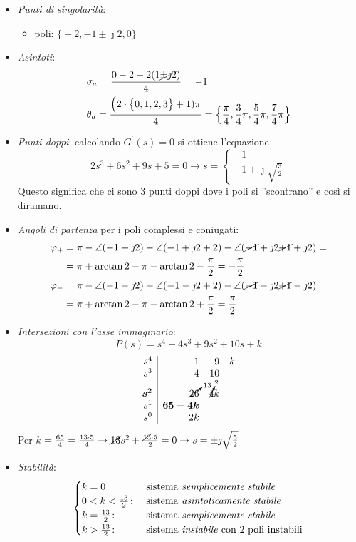 \begin{itemize}
	\item \emph{Punti di singolarità}:
		\begin{itemize}
			\item poli: \(\bigl\{ -2, -1\pm\jmath2, 0 \bigr\}\)
		\end{itemize}
	\item \emph{Asintoti}:
		\begin{align*}
			& \sigma_a = \frac{0-2-2(1\cancel{\pm\jmath2})}{4} = -1 \\
			& \theta_a = \frac{\Bigl(2 \cdot \bigl\{ 0,1,2,3 \bigr\} +1)\pi}{4} = \Bigl\{ \frac{\pi}{4}, \frac{3}{4}\pi, \frac{5}{4}\pi, \frac{7}{4}\pi \Bigr\}
		\end{align*}
	\item \emph{Punti doppi}:
		calcolando \(G^\prime(s) = 0\) si ottiene l'equazione
		\[
			2s^3 +6s^2 +9s +5 = 0 \rightarrow s = \begin{cases} -1 \\ -1 \pm\jmath\sqrt{\frac{3}{2}} \end{cases}
		\]
		Questo significa che ci sono 3 punti doppi dove i poli si
		''scontrano'' e così si diramano.
	\item \emph{Angoli di partenza} per i poli complessi e coniugati:
		\begin{align*}
			\varphi_+ &= \pi - \angle(-1+\jmath2) -\angle(-1+\jmath2+2) -\angle(\cancel{-1}+\jmath2\cancel{+1}+\jmath2) = \\
				  &= \pi +\arctan{2} -\pi -\arctan{2} -\frac{\pi}{2} = -\frac{\pi}{2} \\
			\varphi_- &= \pi -\angle(-1-\jmath2) -\angle(-1-\jmath2+2) -\angle(\cancel{-1}-\jmath2\cancel{+1}-\jmath2) = \\
				  &= \pi +\arctan{2} -\pi -\arctan{2} +\frac{\pi}{2} = \frac{\pi}{2}
		\end{align*}
	\item \emph{Intersezioni con l'asse immaginario}:
		\[
			P(s) = s^4 +4s^3 +9s^2 +10s +k
		\]
		\[
			\begin{array}{r|rrr}
				s^4 & 1 &  9 & k \\
				s^3 & 4 & 10 \\
				\bm{s^2} & \cancelto{13}{26} & \cancelto{2}{4} k \\
				s^1 & \bm{65-4k} \\
				s^0 & 2k
			\end{array}
		\]
		Per \(k = \frac{65}{4} = \frac{13\cdot5}{4} \rightarrow \cancel{13}s^2 + \frac{\cancel{13}\cdot5}{2} = 0 \rightarrow s = \pm\jmath\sqrt{\frac{5}{2}}\)
	\item \emph{Stabilità}:
		\[\begin{cases}
			k=0\colon & \text{sistema \emph{semplicemente stabile}} \\
			0<k<\frac{13}{2}\colon & \text{sistema \emph{asintoticamente stabile}} \\
			k=\frac{13}{2}\colon & \text{sistema \emph{semplicemente stabile}} \\
			k>\frac{13}{2}\colon & \text{sistema \emph{instabile} con 2 poli instabili}
		\end{cases}\]
\end{itemize}


